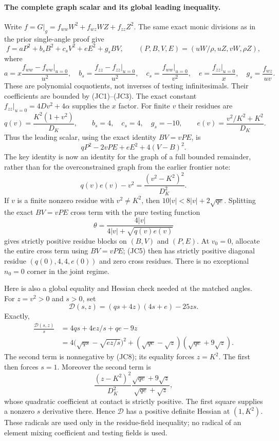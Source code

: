 \paragraph{The complete graph scalar and its global leading inequality.}
Write $f=G|_g=f_{ww}W^2+f_{wz}WZ+f_{zz}Z^2$.  The same exact monic
divisions as in the prior single-angle proof give
\[
 f=aP^2+b_sB^2+c_sV^2+eE^2+g_sBV,
 \qquad (P,B,V,E)=(uW/\rho,uZ,vW,\rho Z),              \tag{JC5}
\]
where
\[
 a=x\frac{f_{ww}-f_{ww}|_{u=0}}{u^2},\quad
 b_s=\frac{f_{zz}-f_{zz}|_{u=0}}{u^2},\quad
 c_s=\frac{f_{ww}|_{u=0}}{v^2},\quad
 e=\frac{f_{zz}|_{u=0}}x,\quad g_s=\frac{f_{wz}}{uv}.
\]
These are polynomial coquotients, not inverses of testing
infinitesimals.  Their coefficients are bounded by (JC1)--(JC3).
The exact constant $f_{zz}|_{u=0}=4Dv^2+4\alpha$ supplies the $x$
factor.  For finite $v$ their residues are
\[
 q(v)=\frac{K^2(1+v^2)}{D_K},\qquad
 b_s=4,\quad c_s=4,\quad g_s=-10,\qquad
 e(v)=\frac{v^2/K^2+K^2}{D_K}.                        \tag{JC6}
\]
Thus the leading scalar, using the exact identity $BV=vPE$, is
\[
                  qP^2-2vPE+eE^2+4(V-B)^2.           \tag{JC7}
\]
The key identity is now an identity for the graph of a full
bounded remainder, rather than for the overconstrained graph from
the earlier frontier note:
\[
                   q(v)e(v)-v^2
                    =\frac{(v^2-K^2)^2}{D_K^2}.      \tag{JC8}
\]
If $v$ is a finite nonzero residue with $v^2\ne K^2$, then
$10|v|<8|v|+2\sqrt{qe}$.  Splitting the exact $BV=vPE$ cross
term with the pure testing function
\[
             \theta=\frac{4|v|}{4|v|+\sqrt{q(v)e(v)}}
\]
gives strictly positive residue blocks on $(B,V)$ and $(P,E)$.
At $v_0=0$, allocate the entire cross term using $BV=vPE$;
(JC5) then has strictly positive diagonal residue
$(q(0),4,4,e(0))$ and zero cross residues.  There is no exceptional
$n_0=0$ corner in the joint regime.

Here is also a global equality and Hessian check needed at the
matched angles.  For $z=v^2>0$ and $s>0$, set
\[
 \mathcal D(s,z)=(q s+4z)(4s+e)-25zs.
\]
Exactly,
\begin{align*}
 \frac{\mathcal D(s,z)}s
 &=4qs+4ez/s+qe-9z\\
 &=4\bigl(\sqrt{qs}-\sqrt{ez/s}\bigr)^2
       +(\sqrt{qe}-\sqrt z)(\sqrt{qe}+9\sqrt z).    \tag{JC9}
\end{align*}
The second term is nonnegative by (JC8); its equality forces
$z=K^2$.  The first then forces $s=1$.  Moreover the second term is
\[
 \frac{(z-K^2)^2}{D_K^2}
       \frac{\sqrt{qe}+9\sqrt z}{\sqrt{qe}+\sqrt z},
\]
whose quadratic coefficient at contact is strictly positive.
The first square supplies a nonzero $s$ derivative there.
Hence $\mathcal D$ has a positive definite Hessian at $(1,K^2)$.
These radicals are used only in the residue-field inequality; no
radical of an element mixing coefficient and testing fields is used.

